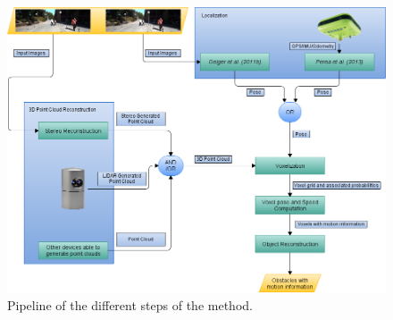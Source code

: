 \begin{figure}[h!]
  \centering
  \includegraphics[height=\textwidth, width=\textwidth]{pipeline_general}
  \caption{Pipeline of the different steps of the method.}
  \label{fig:cp05_pipeline_general}
\end{figure}



